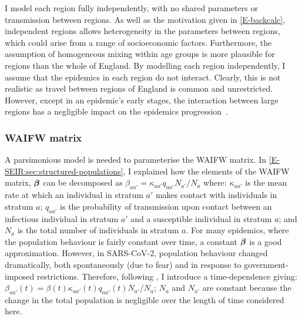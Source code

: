 \documentclass[thesis.tex]{subfiles}
\begin{document}

I model each region fully independently, \ie with no shared parameters or transmission between regions.
As well as the motivation given in \cref{E-backcalc}, independent regions allows heterogeneity in the parameters between regions, which could arise from a range of socioeconomic factors.
Furthermore, the assumption of homogeneous mixing within age groups is more plausible for regions than the whole of England.
By modelling each region independently, I assume that the epidemics in each region do not interact.
Clearly, this is not realistic as travel between regions of England is common and unrestricted.
However, except in an epidemic's early stages, the interaction between large regions has a negligible impact on the epidemics progression~\autocite[e.g.][]{birrellRealtimea,gogSpatial,eggoSpatial}.

\subsubsection{WAIFW matrix} \label{SEIR:sec:WAIFW-application}

A parsimonious model is needed to parameterise the WAIFW matrix.
In \cref{E-SEIR:sec:structured-populations}, I explained how the elements of the WAIFW matrix, $\bm{\beta}$ can be decomposed as $\beta_{aa'} = \kappa_{aa'} q_{aa'} N_{a'} / N_{a}$ where: $\kappa_{aa'}$ is the mean rate at which an individual in stratum $a'$ makes contact with individuals in stratum $a$; $q_{aa'}$ is the probability of transmission upon contact between an infectious individual in stratum $a'$ and a susceptible individual in stratum $a$; and $N_{a}$ is the total number of individuals in stratum $a$.
For many epidemics, where the population behaviour is fairly constant over time, a constant $\bm{\beta}$ is a good approximation.
However, in SARS-CoV-2, population behaviour changed dramatically, both spontaneously (\eg due to fear) and in response to government-imposed restrictions.
Therefore, following \textcite{birrellRealtime}, I introduce a time-dependence giving: $\beta_{aa'}(t) = \beta(t) \kappa_{aa'}(t) q_{aa'}(t) N_{a'} / N_a$; $N_a$ and $N_{a'}$ are constant because the change in the total population is negligible over the length of time considered here.
\end{document}

